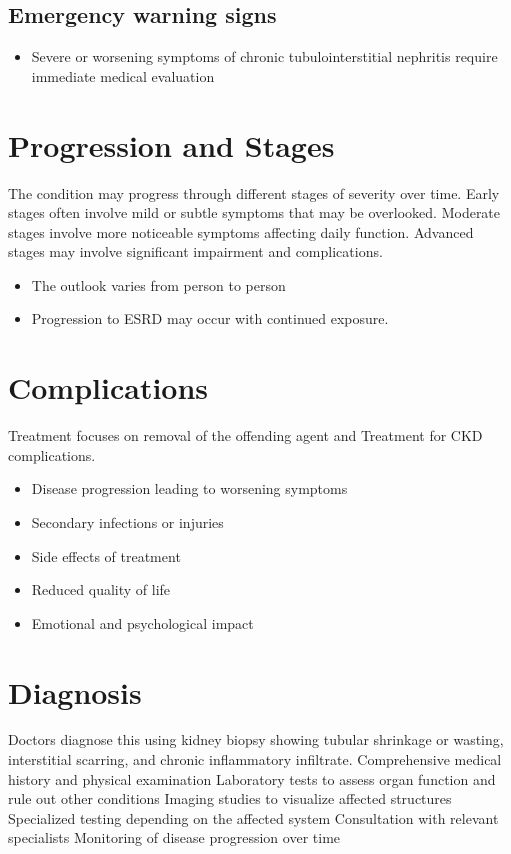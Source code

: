 \subsection{Emergency warning signs}
\begin{itemize}[noitemsep]
  \item Severe or worsening symptoms of chronic tubulointerstitial nephritis require immediate medical evaluation
\end{itemize}
\section{Progression and Stages}
The condition may progress through different stages of severity over time. Early stages often involve mild or subtle symptoms that may be overlooked. Moderate stages involve more noticeable symptoms affecting daily function. Advanced stages may involve significant impairment and complications.

\begin{itemize}[noitemsep]
  \item The outlook varies from person to person
  \item Progression to ESRD may occur with continued exposure.
\end{itemize}
\section{Complications}
Treatment focuses on removal of the offending agent and Treatment for CKD complications.

\begin{itemize}[noitemsep]
  \item Disease progression leading to worsening symptoms
  \item Secondary infections or injuries
  \item Side effects of treatment
  \item Reduced quality of life
  \item Emotional and psychological impact
\end{itemize}
\section{Diagnosis}
Doctors diagnose this using kidney biopsy showing tubular shrinkage or wasting, interstitial scarring, and chronic inflammatory infiltrate. Comprehensive medical history and physical examination Laboratory tests to assess organ function and rule out other conditions Imaging studies to visualize affected structures Specialized testing depending on the affected system Consultation with relevant specialists Monitoring of disease progression over time

